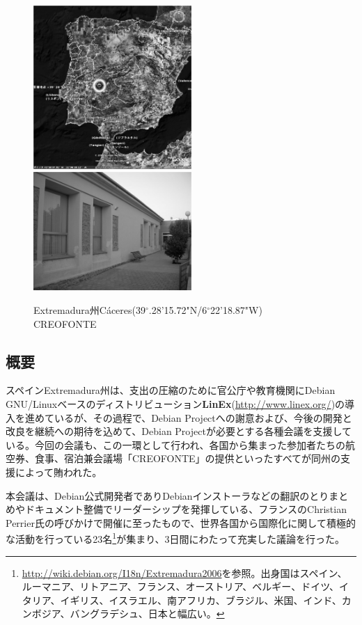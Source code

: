 \documentclass[mingoth,a4paper]{jsarticle}
\begin{document}
\begin{figure}[htbp]
  \begin{center}
    \includegraphics[width=6cm]{image200610/cesar.eps}
    \includegraphics[width=6cm]{image200610/creofonte.eps}
  \end{center}
  \caption{Extremadura州C\'{a}ceres(39$^{\circ}$.28'15.72"N/6$^{\circ}$22'18.87"W) CREOFONTE}
  \label{fig:casar}
\end{figure}

\subsection{概要}
\label{sec:extremadura-abstract}

スペインExtremadura州は、支出の圧縮のために官公庁や教育機関にDebian GNU/Linuxベースのディストリビューション\textbf{LinEx}(\url{http://www.linex.org/})の導入を進めているが、その過程で、Debian Projectへの謝意および、今後の開発と改良を継続への期待を込めて、Debian Projectが必要とする各種会議を支援している。今回の会議も、この一環として行われ、各国から集まった参加者たちの航空券、食事、宿泊兼会議場「CREOFONTE」の提供といったすべてが同州の支援によって賄われた。

本会議は、Debian公式開発者でありDebianインストーラなどの翻訳のとりまとめやドキュメント整備でリーダーシップを発揮している、フランスのChristian Perrier氏の呼びかけで開催に至ったもので、世界各国から国際化に関して積極的な活動を行っている23名\footnote{\url{http://wiki.debian.org/I18n/Extremadura2006}を参照。出身国はスペイン、ルーマニア、リトアニア、フランス、オーストリア、ベルギー、ドイツ、イタリア、イギリス、イスラエル、南アフリカ、ブラジル、米国、インド、カンボジア、バングラデシュ、日本と幅広い。}が集まり、3日間にわたって充実した議論を行った。
\end{document}
